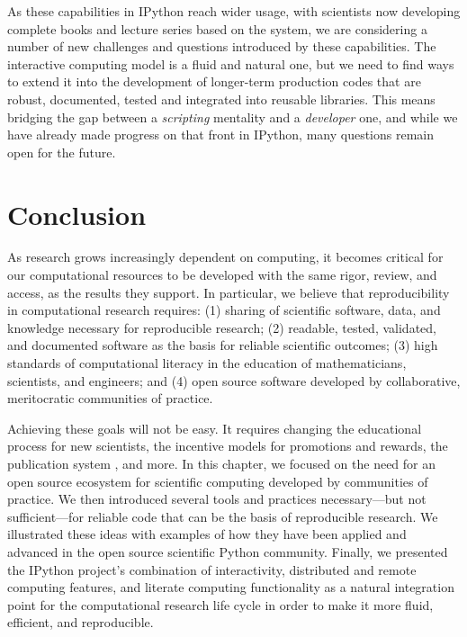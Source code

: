 \documentclass[11pt,oneside,english]{article}
\begin{document}
As these capabilities in IPython reach wider usage, with scientists now
developing complete books and lecture series based on the system, we are
considering a number of new challenges and questions introduced by these
capabilities.  The interactive computing model is a fluid and natural one, but
we need to find ways to extend it into the development of longer-term
production codes that are robust, documented, tested and integrated into
reusable libraries.  This means bridging the gap between a \emph{scripting}
mentality and a \emph{developer} one, and while we have already made progress on
that front in IPython, many questions remain open for the future.

\section{Conclusion}\label{conclusion}

As research grows increasingly dependent on computing, it becomes critical for
our computational resources to be developed with the same rigor, review,
and access, as the results they support. In particular, we believe that
reproducibility in computational research requires: (1) sharing of scientific
software, data, and knowledge necessary for reproducible research; (2)
readable, tested, validated, and documented software as the basis for reliable
scientific outcomes; (3) high standards of computational literacy in the
education of mathematicians, scientists, and engineers; and (4) open source
software developed by collaborative, meritocratic communities of practice.

Achieving these goals will not be easy.  It requires changing the educational
process for new scientists, the incentive models for promotions and rewards,
the publication system \cite{neylon2012changing}, and more. In this chapter, we
focused on the need for an open source ecosystem for scientific computing
developed by communities of practice.  We then introduced several tools and
practices necessary---but not sufficient---for reliable code that can be the
basis of reproducible research.  We illustrated these ideas with examples of
how they have been applied and advanced in the open source scientific Python
community.  Finally, we presented the IPython project's combination of
interactivity, distributed and remote computing features, and literate
computing functionality as a natural integration point for the computational
research life cycle in order to make it more fluid, efficient, and
reproducible.
\end{document}
